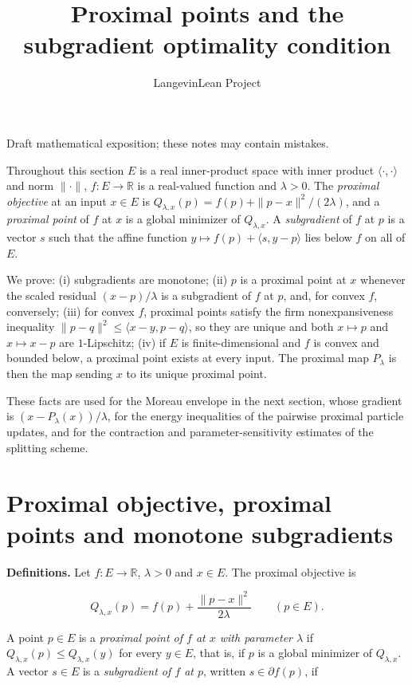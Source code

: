 \documentclass[11pt,a4paper]{article}
\title{\texorpdfstring{Proximal points and the subgradient optimality condition}{Proximal points and the subgradient optimality condition}}
\author{LangevinLean Project}
\date{}
\begin{document}
\maketitle
Draft mathematical exposition; these notes may contain mistakes.


Throughout this section \(E\) is a real inner-product space with inner product \(\langle\cdot,\cdot\rangle\) and norm \(\|\cdot\|\), \(f:E\to\mathbb R\) is a real-valued function and \(\lambda>0\). The \emph{proximal objective} at an input \(x\in E\) is \(Q_{\lambda,x}(p)=f(p)+\|p-x\|^2/(2\lambda)\), and a \emph{proximal point} of \(f\) at \(x\) is a global minimizer of \(Q_{\lambda,x}\). A \emph{subgradient} of \(f\) at \(p\) is a vector \(s\) such that the affine function \(y\mapsto f(p)+\langle s,y-p\rangle\) lies below \(f\) on all of \(E\).




We prove: (i) subgradients are monotone; (ii) \(p\) is a proximal point at \(x\) whenever the scaled residual \((x-p)/\lambda\) is a subgradient of \(f\) at \(p\), and, for convex \(f\), conversely; (iii) for convex \(f\), proximal points satisfy the firm nonexpansiveness inequality \(\|p-q\|^2\le\langle x-y,p-q\rangle\), so they are unique and both \(x\mapsto p\) and \(x\mapsto x-p\) are \(1\)-Lipschitz; (iv) if \(E\) is finite-dimensional and \(f\) is convex and bounded below, a proximal point exists at every input. The proximal map \(P_\lambda\) is then the map sending \(x\) to its unique proximal point.




These facts are used for the Moreau envelope in the next section, whose gradient is \((x-P_\lambda(x))/\lambda\), for the energy inequalities of the pairwise proximal particle updates, and for the contraction and parameter-sensitivity estimates of the splitting scheme.


\section{\texorpdfstring{Proximal objective, proximal points and monotone subgradients}{Proximal objective, proximal points and monotone subgradients}}


\textbf{Definitions.} Let \(f:E\to\mathbb R\), \(\lambda>0\) and \(x\in E\). The proximal objective is


\[Q_{\lambda,x}(p)=f(p)+\frac{\|p-x\|^2}{2\lambda}\qquad(p\in E).\]


A point \(p\in E\) is a \emph{proximal point of \(f\) at \(x\) with parameter \(\lambda\)} if \(Q_{\lambda,x}(p)\le Q_{\lambda,x}(y)\) for every \(y\in E\), that is, if \(p\) is a global minimizer of \(Q_{\lambda,x}\). A vector \(s\in E\) is a \emph{subgradient of \(f\) at \(p\)}, written \(s\in\partial f(p)\), if
\end{document}
